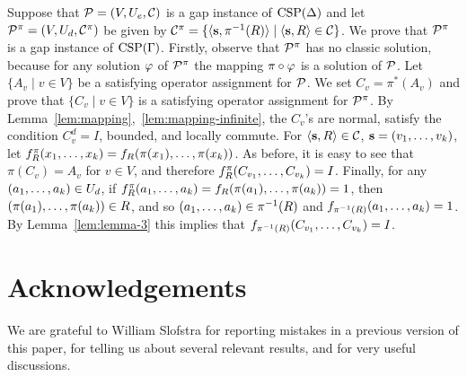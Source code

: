 \documentclass[11pt,letter]{article}
\begin{document}
Suppose that ${\mathcal P}=(V,U_e,{\mathcal C})$ is a gap instance of ${\rm CSP}(\Delta)$ and let ${\mathcal P}^\pi=(V,U_d,{\mathcal C}^\pi)$ be given by ${\mathcal C}^\pi=\{\langle {\bf s},\pi^{-1}(R) \rangle\mid \langle {\bf s},R \rangle\in{\mathcal C}\}$. We prove that ${\mathcal P}^\pi$ is a gap instance of ${\rm CSP}(\Gamma)$. Firstly, observe that ${\mathcal P}^\pi$ has no classic solution, because for any solution $\varphi$ of ${\mathcal P}^\pi$ the mapping $\pi\circ\varphi$ is a solution of ${\mathcal P}$. Let $\{A_v\mid v\in V\}$ be a satisfying operator assignment for ${\mathcal P}$. We set $C_v=\pi^*(A_v)$ and prove that $\{C_v\mid v\in V\}$ is a satisfying operator assignment for ${\mathcal P}^\pi$. By Lemma~\ref{lem:mapping},~\ref{lem:mapping-infinite}, the $C_v$'s are normal, satisfy the condition $C_v^d=I$, bounded, and locally commute. For $\langle {\bf s},R \rangle\in{\mathcal C}$, ${\bf s}=(v _1,\ldots, v _{k})$, let $f^\pi_R(x _1,\ldots, x _{k})=f_R(\pi(x_1),\ldots,\pi(x_k))$. As before, it is easy to see that $\pi(C_v)=A_v$ for $v\in V$, and therefore $f^\pi_R(C_{v_1},\ldots, C_{v_k})=I$. Finally, for any $(a _1,\ldots, a _{k})\in U_d$, if $f^\pi_R(a _1,\ldots, a _{k})=f_R(\pi(a_1),\ldots,\pi(a_k))=1$, then $(\pi(a_1),\ldots,\pi(a_k))\in R$, and so $(a _1,\ldots, a _{k})\in\pi^{-1}(R)$ and $f_{\pi^{-1}(R)}(a _1,\ldots, a _{k})=1$. By Lemma~\ref{lem:lemma-3} this implies that $f_{\pi^{-1}(R)}(C_{v_1},\ldots, C_{v_k})=I$.


 
\section*{Acknowledgements} We are grateful to William Slofstra for reporting
mistakes in a previous version of this paper, for telling us about several
relevant results, and for very useful discussions.

{\small


}
\end{document}

